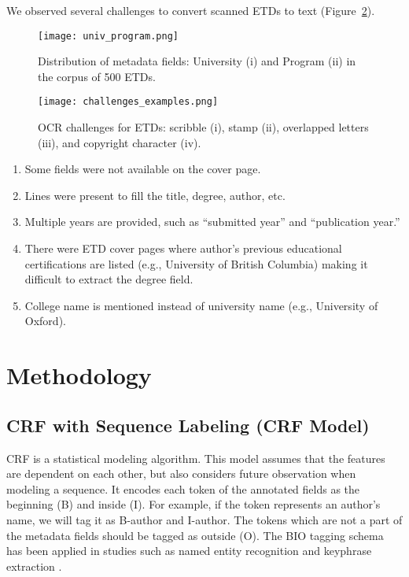 \documentclass{article}
\begin{document}
We observed several challenges to convert scanned ETDs to text (Figure~\ref{fig:challenges}). 
\begin{figure}[t]
\centering
\texttt{[image: univ\_program.png]}\vspace{-7mm}
   \caption{Distribution of metadata fields: University (i) and Program (ii) in the corpus of 500 ETDs.}
   \label{fig:dataset} 
\end{figure}
\begin{figure}[t]
    \centering
   \texttt{[image: challenges\_examples.png]}\caption{OCR challenges for ETDs: scribble (i), stamp (ii), overlapped letters (iii), and copyright character (iv).}
   \label{fig:challenges}
\end{figure} 

\begin{enumerate}
    \item Some fields were not available on the cover page.
    \item Lines were present to fill the title, degree, author, etc.  
    \item Multiple years are provided, such as ``submitted year'' and ``publication year.''
    \item There were ETD cover pages where author's previous educational certifications are listed (e.g., University of British Columbia) making it difficult to extract the degree field. 
    \item College name is mentioned instead of university name (e.g., University of Oxford).
\end{enumerate}

\section{Methodology}
\subsection{CRF with Sequence Labeling (CRF Model)}
CRF is a statistical modeling algorithm. This model assumes that the features are dependent on each other, but also considers future observation when modeling a sequence. It encodes each token of the annotated fields as the beginning (B) and inside (I). For example, if the token represents an author's name, we will tag it as B-author and I-author. The tokens which are not a part of the metadata fields should be tagged as outside (O). The BIO tagging schema has been applied in studies such as named entity recognition \cite{hesdk-jianwu}\cite{councill2008parscit} and keyphrase extraction \cite{sujatha-keyphrase}. 
\end{document}
